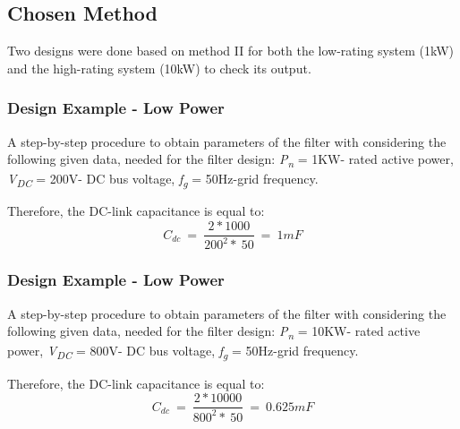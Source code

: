 \documentclass[12pt,a4paper]{book}
\begin{document}
\subsection{Chosen Method}
Two designs were done based on method II for both the low-rating system (1kW) and the high-rating system (10kW) to check its output.

\subsubsection{Design Example - Low Power}
A step-by-step procedure to obtain parameters of the filter with considering the following given data, needed for the filter design: \emph{P\textsubscript{n}} = 1KW- rated active power, \emph{V\textsubscript{DC}} = 200V- DC bus voltage, \emph{f\textsubscript{g}} = 50Hz-grid frequency.

Therefore, the DC-link capacitance is equal to:
\[C_{dc}\  = \ \frac{2*1000}{200^{2}*\ 50}\  = \ 1mF\]

\subsubsection{Design Example - Low Power}
A step-by-step procedure to obtain parameters of the filter with considering the following given data, needed for the filter design: \emph{P\textsubscript{n}} = 10KW- rated active power, \emph{V\textsubscript{DC}} = 800V- DC bus voltage, \emph{f\textsubscript{g}} = 50Hz-grid frequency.

Therefore, the DC-link capacitance is equal to:
\[C_{dc}\  = \ \frac{2*10000}{800^{2}*\ 50}\  = \ 0.625mF\]




\end{document}
